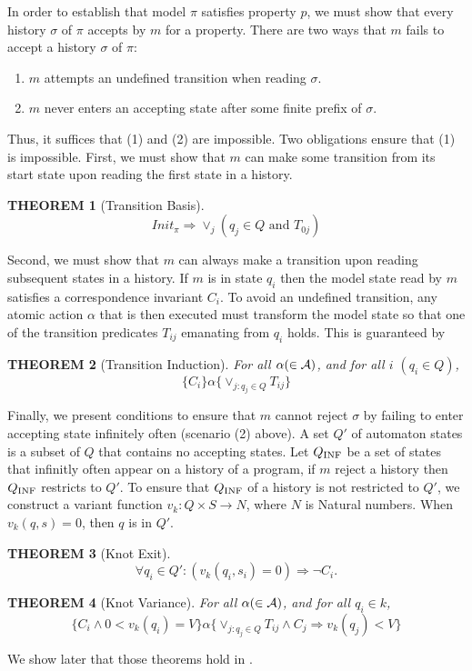 \documentclass[12pt,a4paper,titlepage]{article}
\theoremstyle{break}
\newtheorem{theorem}{THEOREM}[section]
\begin{document}
In order to establish that model $\pi$ satisfies property $p$, we must show that every history $\sigma$ of $\pi$ accepts by $m$ for a property.
There are two ways that $m$ fails to accept a history \(\sigma\) of $\pi$:
  \begin{enumerate}
\item $m$ attempts an undefined transition when reading \(\sigma\).
\item $m$ never enters an accepting state after some finite prefix of \(\sigma\).
  \end{enumerate}
Thus, it suffices that (1) and (2) are impossible.
Two obligations ensure that (1) is impossible.
First, we must show that $m$ can make some transition from its start state upon reading the first state in a history.
  \begin{theorem}[Transition Basis]
    \begin{displaymath}
Init_{\pi}\Rightarrow\vee_{j}(q_j\in Q\mbox{ and }T_{0j})
    \end{displaymath}
  \end{theorem}
Second, we must show that $m$ can always make a transition upon reading subsequent states in a history.
If $m$ is in state \(q_i\) then the model state read by $m$ satisfies a correspondence invariant \(C_i\).
To avoid an undefined transition, any atomic action \(\alpha\) that is then executed must transform the model state so that one of the transition predicates \(T_{ij}\) emanating from \(q_i\) holds.
This is guaranteed by 
  \begin{theorem}[Transition Induction]
For all \(\alpha (\in {\cal A})\), and for all $i$ \((q_i\in Q)\),
    \begin{displaymath}
\{C_i\}\alpha\{\vee_{j:q_j\in Q}T_{ij}\}
    \end{displaymath}
  \end{theorem}

Finally, we present conditions to ensure that $m$ cannot reject \(\sigma\) by failing to enter accepting state infinitely often (scenario (2) above).
A set $Q'$ of automaton states is a subset of $Q$ that contains no accepting states.
Let \(Q_{\mathop{\mathrm{INF}}\nolimits}\) be a set of states that infinitly often appear on a history of a program,
if $m$ reject a history then \(Q_{\mathop{\mathrm{INF}}\nolimits}\) restricts to $Q'$.
To ensure that \(Q_{\mathop{\mathrm{INF}}\nolimits}\) of a history is not restricted to $Q'$, we construct a variant function
 \(v_k:Q\times S\rightarrow N\), where $N$ is Natural numbers.
When \(v_k(q,s)=0\), then $q$ is in $Q'$.
  \begin{theorem}[Knot Exit]
    \begin{displaymath}
\forall q_i\in Q'\colon (v_k(q_i,s_i)=0)\Rightarrow \neg C_i.
    \end{displaymath}
  \end{theorem}
  \begin{theorem}[Knot Variance]
For all \(\alpha (\in {\cal A})\), and for all \(q_i\in k\),
    \begin{displaymath}
\{C_i\wedge0<v_k(q_i)=V\}\alpha\{\vee_{j:q_j\in Q}T_{ij}\wedge C_j\Rightarrow v_k(q_j)<V\}
    \end{displaymath}
  \end{theorem}
We show later that those theorems hold in \NHK.
%
%
\end{document}

